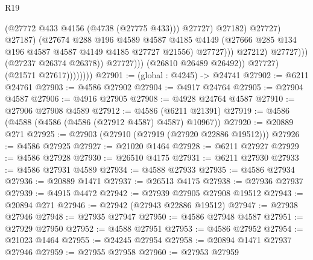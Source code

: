 \begin{lexlean}{R19}
\begin{coremodule}
                                                  (@27772 @433 @4156 (@4738 (@27775 @433)))
                                                  @27727)
                                                @27182)
                                              @27727)
                                            @27187)
                                          (@27674
                                            @288
                                            @196
                                            @4589
                                            @4587
                                            @4185
                                            @4149
                                            (@27666
                                              @285
                                              @134
                                              @196
                                              @4587
                                              @4587
                                              @4149
                                              @4185
                                              @27727
                                              @21556)
                                            @27727)))
                                      @27212)
                                    @27727)))
                              (@27237 @26374 @26378))
                            @27727)))
                      (@26810 @26489 @26492))
                    @27727)
                  (@21571 @27617))))))))
@27901 := (global : @4245) -> @24741
@27902 := @6211 @24761
@27903 := @4586 @27902
@27904 := @4917 @24764
@27905 := @27904 @4587
@27906 := @4916 @27905
@27908 := @4928 @24764 @4587
@27910 := @27906 @27908 @4589
@27912 := @4586 (@6211 @21391)
@27919 := @4586 (@4588 (@4586 (@4586 (@27912 @4587) @4587) @10967))
@27920 := @20889 @271
@27925 := @27903 (@27910 (@27919 (@27920 @22886 @19512)))
@27926 := @4586 @27925
@27927 := @21020 @1464
@27928 := @6211 @27927
@27929 := @4586 @27928
@27930 := @26510 @4175
@27931 := @6211 @27930
@27933 := @4586 @27931 @4589
@27934 := @4588 @27933
@27935 := @4586 @27934
@27936 := @20889 @1471
@27937 := @26513 @4175
@27938 := @27936 @27937
@27939 := @4915 @4472
@27942 := @27939 @27905 @27908 @19512
@27943 := @20894 @271
@27946 := @27942 (@27943 @22886 @19512)
@27947 := @27938 @27946
@27948 := @27935 @27947
@27950 := @4586 @27948 @4587
@27951 := @27929 @27950
@27952 := @4588 @27951
@27953 := @4586 @27952
@27954 := @21023 @1464
@27955 := @24245 @27954
@27958 := @20894 @1471 @27937 @27946
@27959 := @27955 @27958
@27960 := @27953 @27959

\end{coremodule}
\end{lexlean}
